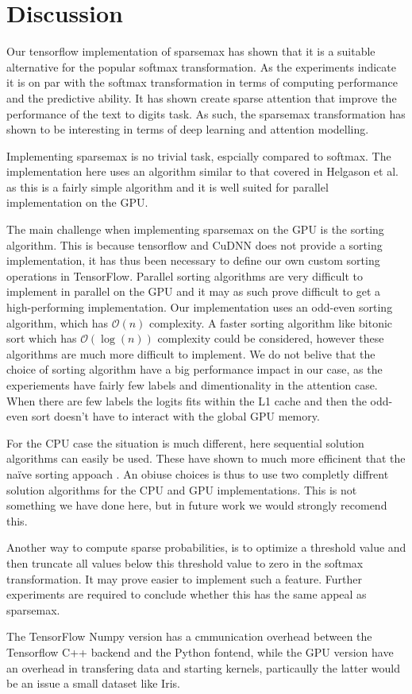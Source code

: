 \section{Discussion}
Our tensorflow implementation of sparsemax has shown that it is a suitable alternative for the popular softmax transformation. As the experiments indicate it is on par with the softmax transformation in terms of computing performance and the predictive ability.
It has shown create sparse attention that improve the performance of the text to digits task. As such, the sparsemax transformation has shown to be interesting in terms of deep learning and attention modelling.

Implementing sparsemax is no trivial task, espcially compared to softmax. The implementation here uses an algorithm similar to that covered in Helgason et al. \cite{Helgason1980} as this is a fairly simple algorithm and it is well suited for parallel implementation on the GPU.

The main challenge when implementing sparsemax on the GPU is the sorting algorithm. This is because tensorflow and CuDNN does not provide a sorting implementation, it has thus been necessary to define our own custom sorting operations in TensorFlow. Parallel sorting algorithms are very difficult to implement in parallel on the GPU and it may as such prove difficult to get a high-performing implementation. Our implementation uses an odd-even sorting algorithm, which has $\mathcal{O}(n)$ complexity. A faster sorting algorithm like bitonic sort which has $\mathcal{O}(\log(n))$ complexity could be considered, however these algorithms are much more difficult to implement. We do not belive that the choice of sorting algorithm have a big performance impact in our case, as the experiements have fairly few labels and dimentionality in the attention case. When there are few labels the logits fits within the L1 cache and then the odd-even sort doesn't have to interact with the global GPU memory. 

For the CPU case the situation is much different, here sequential solution algorithms can easily be used. These have shown to much more efficinent that the naïve sorting appoach \cite{Liu2016}. An obiuse choices is thus to use two completly diffrent solution algorithms for the CPU and GPU implementations. This is not something we have done here, but in future work we would strongly recomend this.

Another way to compute sparse probabilities, is to optimize a threshold value and then truncate all values below this threshold value to zero in the softmax transformation. It may prove easier to implement such a feature. Further experiments are required to conclude whether this has the same appeal as sparsemax.


The TensorFlow Numpy version has a cmmunication overhead between the Tensorflow C++ backend and the Python fontend, while the GPU version have an overhead in transfering data and starting kernels, particaully the latter would be an issue a small dataset like Iris.

